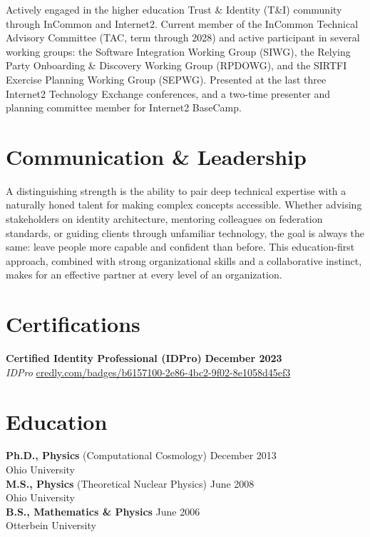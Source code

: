 \documentclass[12pt, letterpaper]{article}
\begin{document}
Actively engaged in the higher education Trust \& Identity (T\&I) community through InCommon and Internet2. Current member of the InCommon Technical Advisory Committee (TAC, term through 2028) and active participant in several working groups: the Software Integration Working Group (SIWG), the Relying Party Onboarding \& Discovery Working Group (RPDOWG), and the SIRTFI Exercise Planning Working Group (SEPWG). Presented at the last three Internet2 Technology Exchange conferences, and a two-time presenter and planning committee member for Internet2 BaseCamp.

\section{Communication \& Leadership}

A distinguishing strength is the ability to pair deep technical expertise with a naturally honed talent for making complex concepts accessible. Whether advising stakeholders on identity architecture, mentoring colleagues on federation standards, or guiding clients through unfamiliar technology, the goal is always the same: leave people more capable and confident than before. This education-first approach, combined with strong organizational skills and a collaborative instinct, makes for an effective partner at every level of an organization.

\section{Certifications}

\textbf{Certified Identity Professional (IDPro)} \hfill \textbf{December 2023} \\
\textit{IDPro} \quad \href{https://www.credly.com/badges/b6157100-2e86-4bc2-9f02-8e1058d45ef3}{credly.com/badges/b6157100-2e86-4bc2-9f02-8e1058d45ef3}

\section{Education}

\textbf{Ph.D., Physics} (Computational Cosmology) \hfill December 2013 \\
Ohio University \\[4pt]
\textbf{M.S., Physics} (Theoretical Nuclear Physics) \hfill June 2008 \\
Ohio University \\[4pt]
\textbf{B.S., Mathematics \& Physics} \hfill June 2006 \\
Otterbein University
\end{document}
